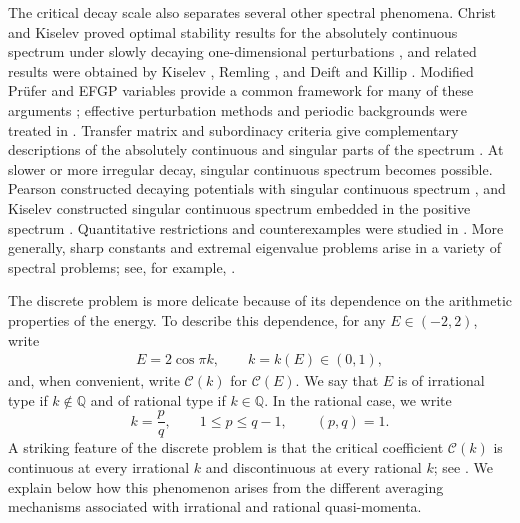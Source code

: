 \documentclass[12pt]{amsart}
\theoremstyle{plain}
\theoremstyle{definition}
\begin{document}
The critical decay scale also separates several other spectral
phenomena.  Christ and Kiselev proved optimal stability results for
the absolutely continuous spectrum under slowly decaying
one-dimensional perturbations \cite{ChristKiselev}, and related
results were obtained by Kiselev \cite{KiselevDuke}, Remling
\cite{RemlingCMP}, and Deift and Killip \cite{DeiftKillip}.  Modified
Pr\"ufer and EFGP variables provide a common framework for many of
these arguments \cite{KiselevLastSimonPruefer,LastSimonDense}; effective perturbation
methods and periodic backgrounds were treated in
\cite{KiselevRemlingSimon,Stolz}.  Transfer matrix and subordinacy
criteria give complementary descriptions of the absolutely
continuous and singular parts of the spectrum
\cite{GilbertPearson,JitomirskayaLast,LastSimonInvent}.
At slower or more irregular decay, singular continuous spectrum becomes
possible.  Pearson constructed decaying potentials with singular
continuous spectrum \cite{Pearson}, and Kiselev constructed singular
continuous spectrum embedded in the positive spectrum
\cite{KiselevJAMS}.  Quantitative restrictions and counterexamples
were studied in \cite{RemlingProc,RemlingDuke}.  More generally, sharp constants and extremal eigenvalue problems
arise in a variety of spectral problems; see, for example,
\cite{AshbaughBenguria,FeffermanSecoEnergy,FeffermanSecoODE,ChuMeng,ChuMengZhang}.


The discrete problem is more delicate because of its dependence on the arithmetic properties of the energy. To describe this dependence, for any $E\in (-2,2)$, write
\begin{align}
	E=2\cos\pi k,
	\qquad k=k(E)\in(0,1),
	\nonumber
\end{align}
and, when convenient, write $\mathcal C(k)$ for $\mathcal C(E)$. We say that $E$ is of irrational type if $k\notin\mathbb Q$ and of rational type if $k\in\mathbb Q$. In the rational case, we write
\[
k=\frac pq,
\qquad 1\leq p\leq q-1,
\qquad (p,q)=1.
\]
A striking feature of the discrete problem is that the critical coefficient $\mathcal C(k)$ is continuous at every irrational $k$ and discontinuous at every rational $k$; see \cite{LiuDiscrete}. We explain below how this phenomenon arises from the different averaging mechanisms associated with irrational and rational quasi-momenta.
\end{document}
